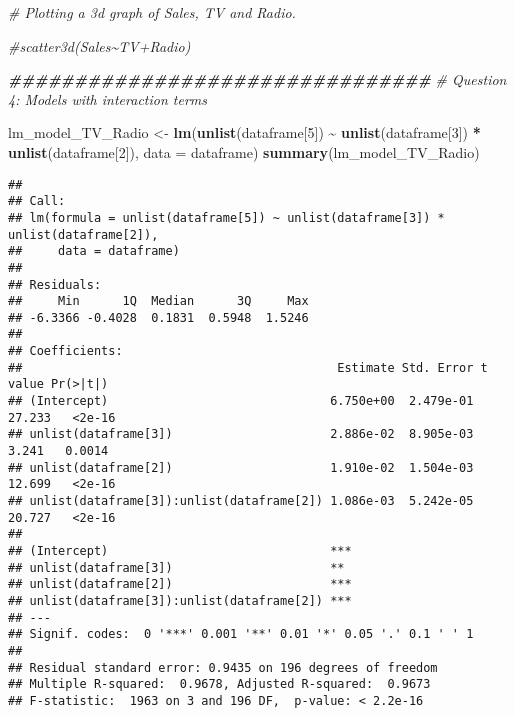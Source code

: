 \documentclass[
]{article}
\newenvironment{Shaded}{\begin{snugshade}}{\end{snugshade}}
\newcommand{\AttributeTok}[1]{\textcolor[rgb]{0.13,0.29,0.53}{#1}}
\newcommand{\CommentTok}[1]{\textcolor[rgb]{0.56,0.35,0.01}{\textit{#1}}}
\newcommand{\DecValTok}[1]{\textcolor[rgb]{0.00,0.00,0.81}{#1}}
\newcommand{\DocumentationTok}[1]{\textcolor[rgb]{0.56,0.35,0.01}{\textbf{\textit{#1}}}}
\newcommand{\FunctionTok}[1]{\textcolor[rgb]{0.13,0.29,0.53}{\textbf{#1}}}
\newcommand{\NormalTok}[1]{#1}
\newcommand{\OtherTok}[1]{\textcolor[rgb]{0.56,0.35,0.01}{#1}}
\newcommand{\SpecialCharTok}[1]{\textcolor[rgb]{0.81,0.36,0.00}{\textbf{#1}}}
\begin{document}
\begin{Shaded}
\begin{Highlighting}[]
\CommentTok{\# Plotting a 3d graph of Sales, TV and Radio.}

\CommentTok{\#scatter3d(Sales\textasciitilde{}TV+Radio)}

\DocumentationTok{\#\#\#\#\#\#\#\#\#\#\#\#\#\#\#\#\#\#\#\#\#\#\#\#\#\#\#\#\#\#\#\#}
\CommentTok{\# Question 4: Models with interaction terms}

\NormalTok{lm\_model\_TV\_Radio }\OtherTok{\textless{}{-}} \FunctionTok{lm}\NormalTok{(}\FunctionTok{unlist}\NormalTok{(dataframe[}\DecValTok{5}\NormalTok{]) }\SpecialCharTok{\textasciitilde{}} \FunctionTok{unlist}\NormalTok{(dataframe[}\DecValTok{3}\NormalTok{]) }\SpecialCharTok{*} \FunctionTok{unlist}\NormalTok{(dataframe[}\DecValTok{2}\NormalTok{]), }\AttributeTok{data =}\NormalTok{ dataframe)}
\FunctionTok{summary}\NormalTok{(lm\_model\_TV\_Radio)}
\end{Highlighting}
\end{Shaded}

\begin{verbatim}
## 
## Call:
## lm(formula = unlist(dataframe[5]) ~ unlist(dataframe[3]) * unlist(dataframe[2]), 
##     data = dataframe)
## 
## Residuals:
##     Min      1Q  Median      3Q     Max 
## -6.3366 -0.4028  0.1831  0.5948  1.5246 
## 
## Coefficients:
##                                            Estimate Std. Error t value Pr(>|t|)
## (Intercept)                               6.750e+00  2.479e-01  27.233   <2e-16
## unlist(dataframe[3])                      2.886e-02  8.905e-03   3.241   0.0014
## unlist(dataframe[2])                      1.910e-02  1.504e-03  12.699   <2e-16
## unlist(dataframe[3]):unlist(dataframe[2]) 1.086e-03  5.242e-05  20.727   <2e-16
##                                              
## (Intercept)                               ***
## unlist(dataframe[3])                      ** 
## unlist(dataframe[2])                      ***
## unlist(dataframe[3]):unlist(dataframe[2]) ***
## ---
## Signif. codes:  0 '***' 0.001 '**' 0.01 '*' 0.05 '.' 0.1 ' ' 1
## 
## Residual standard error: 0.9435 on 196 degrees of freedom
## Multiple R-squared:  0.9678, Adjusted R-squared:  0.9673 
## F-statistic:  1963 on 3 and 196 DF,  p-value: < 2.2e-16
\end{verbatim}
\end{document}
